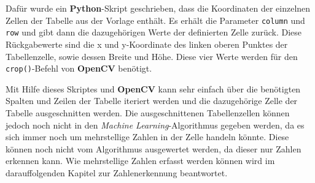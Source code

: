 Dafür wurde ein \textbf{Python}-Skript geschrieben, dass die Koordinaten der einzelnen Zellen der Tabelle aus der Vorlage enthält. Es erhält die Parameter \texttt{column} 
und \texttt{row} und gibt dann die dazugehörigen Werte der definierten Zelle zurück. Diese Rückgabewerte sind die x und y-Koordinate des linken oberen Punktes der
Tabellenzelle, sowie dessen Breite und Höhe. Diese vier Werte werden für den \texttt{crop()}-Befehl von \textbf{OpenCV} benötigt.

Mit Hilfe dieses Skriptes und \textbf{OpenCV} kann sehr einfach über die benötigten Spalten und Zeilen der Tabelle iteriert werden und die dazugehörige Zelle der 
Tabelle ausgeschnitten werden. Die ausgeschnittenen Tabellenzellen können jedoch noch nicht in den \textit{Machine Learning}-Algorithmus gegeben werden, da es sich immer
noch um mehrstellige Zahlen in der Zelle handeln könnte. Diese können noch nicht vom Algorithmus ausgewertet werden, da dieser nur Zahlen erkennen kann.
Wie mehrstellige Zahlen erfasst werden können wird im darauffolgenden Kapitel zur Zahlenerkennung beantwortet.
